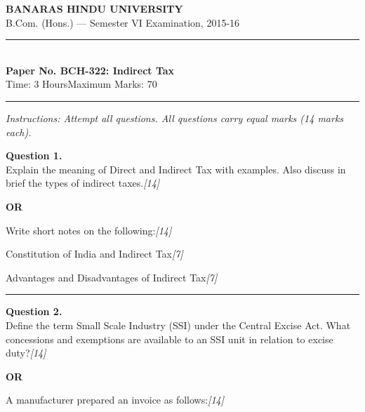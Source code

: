 \documentclass[11pt,a4paper]{article}
\newcommand{\pts}[1]{\hfill   \textit{[#1]}}
\begin{document}
\begin{center}
  {\large\bfseries BANARAS HINDU UNIVERSITY}\\[2pt]
  {\normalsize B.Com. (Hons.) --- Semester VI Examination, 2015-16}\\[6pt]
  \rule{0.8\linewidth}{0.5pt}\\[6pt]
  {\large\bfseries Paper No. BCH-322: Indirect Tax}\\[4pt]
  {\normalsize Time: 3 Hours\hfill Maximum Marks: 70}
\end{center}

\rule{\linewidth}{0.4pt}

\smallskip



\noindent   \textit{Instructions: Attempt all questions. All questions carry equal marks (14 marks each).}

\bigskip




\noindent   \textbf{Question 1.} \\
Explain the meaning of Direct and Indirect Tax with examples. Also discuss in brief the types of indirect taxes.\pts{14}

\centerline{   \textbf{OR}}

Write short notes on the following:\pts{14}

\begin{parts}
  \item Constitution of India and Indirect Tax\pts{7}
  \item Advantages and Disadvantages of Indirect Tax\pts{7}
\end{parts}

\medskip\rule{\linewidth}{0.2pt}




\noindent   \textbf{Question 2.} \\
Define the term Small Scale Industry (SSI) under the Central Excise Act. What concessions and exemptions are available to an SSI unit in relation to excise duty?\pts{14}

\centerline{   \textbf{OR}}

A manufacturer prepared an invoice as follows:\pts{14}
\end{document}
